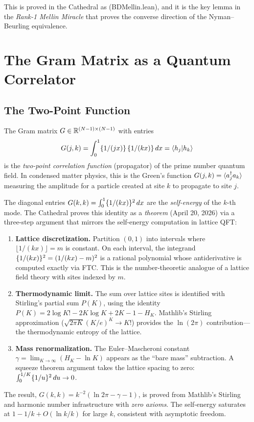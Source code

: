 \documentclass[11pt,a4paper]{article}
\begin{document}
This is proved in the Cathedral as  (BDMellin.lean),
and it is the key lemma in the \emph{Rank-1 Mellin Miracle} that proves
the converse direction of the Nyman--Beurling equivalence.

\section{The Gram Matrix as a Quantum Correlator}

\subsection{The Two-Point Function}

The Gram matrix $G \in \mathbb{R}^{(N-1) \times (N-1)}$ with entries
\[
  G(j,k) = \int_0^1 \{1/(jx)\}\,\{1/(kx)\}\,dx
  = \langle h_j | h_k \rangle
\]
is the \emph{two-point correlation function} (propagator) of the
prime number quantum field. In condensed matter physics, this is the
Green's function $G(j,k) = \langle a_j^\dagger a_k \rangle$ measuring the
amplitude for a particle created at site $k$ to propagate to site $j$.

\begin{observation}[Diagonal = Self-Energy (Proved)]
The diagonal entries $G(k,k) = \int_0^1 \{1/(kx)\}^2\,dx$ are
the \emph{self-energy} of the $k$-th mode. The Cathedral proves
this identity as a \emph{theorem} (April 20, 2026) via a three-step
argument that mirrors the self-energy computation in lattice QFT:
\begin{enumerate}
  \item \textbf{Lattice discretization.} Partition $(0,1)$ into intervals
    where $\lfloor 1/(kx) \rfloor = m$ is constant. On each interval,
    the integrand $\{1/(kx)\}^2 = (1/(kx) - m)^2$ is a rational
    polynomial whose antiderivative is computed exactly via FTC.
    This is the number-theoretic analogue of a lattice field theory
    with sites indexed by $m$.
  \item \textbf{Thermodynamic limit.} The sum over lattice sites is
    identified with Stirling's partial sum $P(K)$, using the identity
    $P(K) = 2\log K! - 2K\log K + 2K - 1 - H_K$.
    Mathlib's Stirling approximation ($\sqrt{2\pi K}(K/e)^K \to K!$)
    provides the $\ln(2\pi)$ contribution---the thermodynamic
    entropy of the lattice.
  \item \textbf{Mass renormalization.} The Euler--Mascheroni constant
    $\gamma = \lim_{K\to\infty}(H_K - \ln K)$ appears as the ``bare
    mass'' subtraction. A squeeze theorem argument takes the lattice
    spacing to zero: $\int_0^{1/K} \{1/u\}^2\,du \to 0$.
\end{enumerate}
The result, $G(k,k) = k^{-2}(\ln 2\pi - \gamma - 1)$, is proved from
Mathlib's Stirling and harmonic number infrastructure with \emph{zero
axioms}. The self-energy saturates at $1 - 1/k + O(\ln k / k)$ for
large $k$, consistent with asymptotic freedom.
\end{observation}
\end{document}
